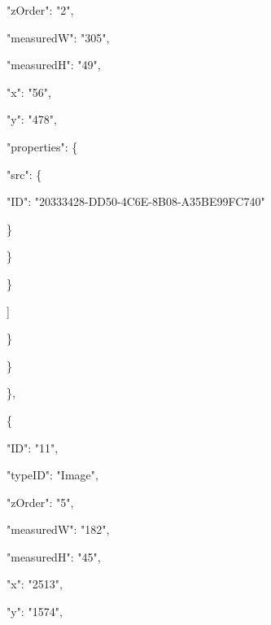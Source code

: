 \documentclass[13pt]{article}
\begin{document}
{\raggedright
{\footnotesize                                     "zOrder": "2",}
}

{\raggedright
{\footnotesize                                     "measuredW": "305",}
}

{\raggedright
{\footnotesize                                     "measuredH": "49",}
}

{\raggedright
{\footnotesize                                     "x": "56",}
}

{\raggedright
{\footnotesize                                     "y": "478",}
}

{\raggedright
{\footnotesize                                     "properties": \{}
}

{\raggedright
{\footnotesize                                         "src": \{}
}

{\raggedright
{\footnotesize                                             "ID":
"20333428-DD50-4C6E-8B08-A35BE99FC740"}
}

{\raggedright
{\footnotesize                                         \}}
}

{\raggedright
{\footnotesize                                     \}}
}

{\raggedright
{\footnotesize                                 \}}
}

{\raggedright
{\footnotesize                             ]}
}

{\raggedright
{\footnotesize                         \}}
}

{\raggedright
{\footnotesize                     \}}
}

{\raggedright
{\footnotesize                 \},}
}

{\raggedright
{\footnotesize                 \{}
}

{\raggedright
{\footnotesize                     "ID": "11",}
}

{\raggedright
{\footnotesize                     "typeID": "Image",}
}

{\raggedright
{\footnotesize                     "zOrder": "5",}
}

{\raggedright
{\footnotesize                     "measuredW": "182",}
}

{\raggedright
{\footnotesize                     "measuredH": "45",}
}

{\raggedright
{\footnotesize                     "x": "2513",}
}

{\raggedright
{\footnotesize                     "y": "1574",}
}
\end{document}
